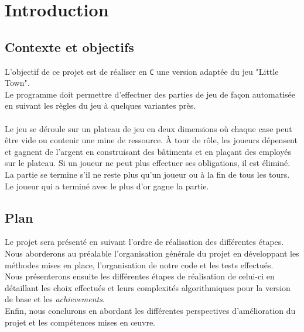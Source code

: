 \vspace*{-0.9cm}
\section*{Introduction}
\subsection*{Contexte et objectifs}
L'objectif de ce projet est de réaliser en \texttt{C} une version adaptée du jeu "Little Town".\\
Le programme doit permettre d'effectuer des parties de jeu de façon automatisée en suivant les règles du jeu à quelques variantes près.\\ \\
Le jeu se déroule sur un plateau de jeu en deux dimensions où chaque case peut être vide ou contenir une mine de ressource.
À tour de rôle, les joueurs dépensent et gagnent de l'argent en construisant des bâtiments et en plaçant des employés sur le plateau.
Si un joueur ne peut plus effectuer ses obligations, il est éliminé.
La partie se termine s'il ne reste plus qu'un joueur ou à la fin de tous les tours.
Le joueur qui a terminé avec le plus d'or gagne la partie.

\subsection*{Plan}
Le projet sera présenté en suivant l'ordre de réalisation des différentes étapes.\\
Nous aborderons au préalable l'organisation générale du projet en développant les méthodes mises en place, l'organisation de notre code et les tests effectués.\\
Nous présenterons ensuite les différentes étapes de réalisation de celui-ci en détaillant les choix effectués et leurs complexités algorithmiques pour la version de base et les \textit{achievements}.\\
Enfin, nous conclurons en abordant les différentes perspectives d'amélioration du projet et les compétences mises en œuvre.

